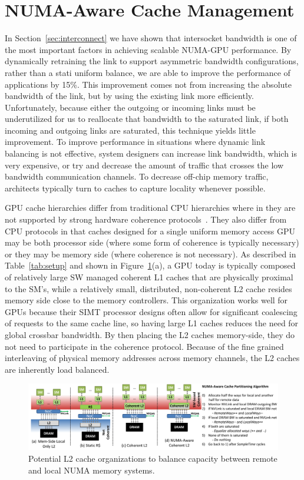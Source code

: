 \section{NUMA-Aware Cache Management}
\label{caching}
In Section~\ref{sec:interconnect} we have shown that intersocket bandwidth is one
of the most important factors in achieving scalable NUMA-GPU performance. By
dynamically retraining the link to support asymmetric bandwidth configurations,
rather than a stati uniform balance, we are able to improve the performance
of applications by 15\%.  This improvement comes not from increasing the
absolute bandwidth of the link, but by using the existing link more efficiently.
Unfortunately, because either the outgoing or incoming links must be underutilized
for us to reallocate that bandwidth to the saturated link, if both incoming and
outgoing links are saturated, this technique yields little improvement.
To improve performance in situations where dynamic link balancing is not effective,
system designers can increase link bandwidth, which is very expensive,
or try and decrease the amount of traffic that crosses the low bandwidth
communication channels.  To decrease off-chip memory traffic, architects typically
turn to caches to capture locality whenever possible.

GPU cache hierarchies differ from traditional CPU hierarchies where in they are
not supported by strong hardware coherence protocols~\cite{XXX}.  They also differ
from CPU protocols in that caches designed for a single uniform memory access GPU
may be both processor side (where some form of coherence is typically necessary)
or they may be memory side (where coherence is not necessary).  As described in
Table~\ref{tab:setup} and shown in Figure~\ref{fig:cacheorg}(a), a GPU today is
typically composed of relatively large SW managed coherent L1 caches that are 
physically proximal to the SM's, while a relatively small, distributed, non-coherent 
L2 cache resides memory side close to the memory controllers.  This
organization works well for GPUs because their SIMT processor designs often allow
for significant coalescing of requests to the same cache line, so having large
L1 caches reduces the need for global crossbar bandwidth.  By then placing the L2
caches memory-side, they do not need to participate in the coherence protocol.  Because of the fine grained interleaving of physical memory addresses
across memory channels, the L2 caches are inherently load balanced.

\begin{figure}[t]
    \centering
    \includegraphics[width=1.0\textwidth]{figures/cache_configurations_static_dynamic.pdf}
    \caption{Potential L2 cache organizations to balance capacity between remote and
    local NUMA memory systems.}
    \label{fig:cacheorg}
\end{figure}

